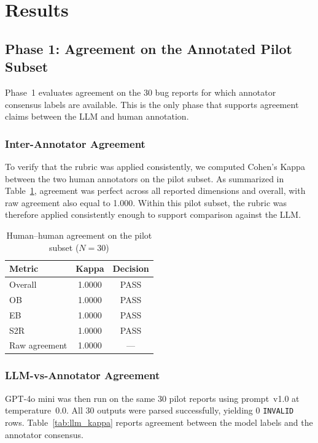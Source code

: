 \section{Results}\label{sec:results}

\subsection{Phase 1: Agreement on the Annotated Pilot Subset}

Phase~1 evaluates agreement on the 30 bug reports for which annotator
consensus labels are available. This is the only phase that supports
agreement claims between the LLM and human annotation.

\subsubsection{Inter-Annotator Agreement}

To verify that the rubric was applied consistently, we computed
Cohen's Kappa between the two human annotators on the pilot subset.
As summarized in Table~\ref{tab:hh_kappa}, agreement was perfect across
all reported dimensions and overall, with raw agreement also equal to
1.000. Within this pilot subset, the rubric was therefore applied
consistently enough to support comparison against the LLM.

\begin{table}[t]
\caption{Human--human agreement on the pilot subset ($N=30$)}
\label{tab:hh_kappa}
\centering
\begin{tabular}{lcc}
\hline
\textbf{Metric} & \textbf{Kappa} & \textbf{Decision} \\
\hline
Overall & 1.0000 & PASS \\
OB      & 1.0000 & PASS \\
EB      & 1.0000 & PASS \\
S2R     & 1.0000 & PASS \\
\hline
Raw agreement & 1.0000 & --- \\
\hline
\end{tabular}
\end{table}

\subsubsection{LLM-vs-Annotator Agreement}

GPT-4o mini was then run on the same 30 pilot reports using
prompt~v1.0 at temperature~0.0. All 30 outputs were parsed
successfully, yielding 0 \texttt{INVALID} rows. Table~\ref{tab:llm_kappa}
reports agreement between the model labels and the annotator consensus.

